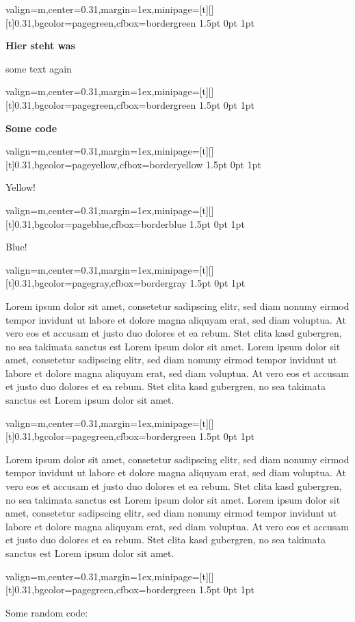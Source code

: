 \documentclass[11pt, a4paper, landscape]{article}
\newcommand{\fancyheader}[1]{
	\centerline{\sffamily \textbf{ \large #1}}
}
\newenvironment{fancybox}[2]
{
	\begin{adjustbox}{valign=m,center=0.31\textwidth,margin=1ex,minipage=[t][][t]{0.31\textwidth},bgcolor=#1,cfbox=#2 1.5pt 0pt 1pt}
	\begin{centering}
}
{
	\end{centering}
	\end{adjustbox}
}
\begin{document}
\begin{multicols}{3}
\raggedcolumns

\begin{fancybox}{pagegreen}{bordergreen}
\fancyheader{Hier steht was}
some text again
\end{fancybox}


\begin{fancybox}{pagegreen}{bordergreen}
\fancyheader{Some code}

\end{fancybox}

\begin{fancybox}{pageyellow}{borderyellow}
	Yellow!
\end{fancybox}

\begin{fancybox}{pageblue}{borderblue}
	Blue!
\end{fancybox}


\begin{fancybox}{pagegray}{bordergray}
Lorem ipsum dolor sit amet, consetetur sadipscing elitr, sed diam nonumy eirmod tempor invidunt ut labore et dolore magna aliquyam erat, sed diam voluptua. At vero eos et accusam et justo duo dolores et ea rebum. Stet clita kasd gubergren, no sea takimata sanctus est Lorem ipsum dolor sit amet. Lorem ipsum dolor sit amet, consetetur sadipscing elitr, sed diam nonumy eirmod tempor invidunt ut labore et dolore magna aliquyam erat, sed diam voluptua. At vero eos et accusam et justo duo dolores et ea rebum. Stet clita kasd gubergren, no sea takimata sanctus est Lorem ipsum dolor sit amet.
\end{fancybox}

\begin{fancybox}{pagegreen}{bordergreen}
Lorem ipsum dolor sit amet, consetetur sadipscing elitr, sed diam nonumy eirmod tempor invidunt ut labore et dolore magna aliquyam erat, sed diam voluptua. At vero eos et accusam et justo duo dolores et ea rebum. Stet clita kasd gubergren, no sea takimata sanctus est Lorem ipsum dolor sit amet. Lorem ipsum dolor sit amet, consetetur sadipscing elitr, sed diam nonumy eirmod tempor invidunt ut labore et dolore magna aliquyam erat, sed diam voluptua. At vero eos et accusam et justo duo dolores et ea rebum. Stet clita kasd gubergren, no sea takimata sanctus est Lorem ipsum dolor sit amet.
\end{fancybox}

\begin{fancybox}{pagegreen}{bordergreen}
Some random code:

\end{fancybox}


\end{multicols}
\end{document}
